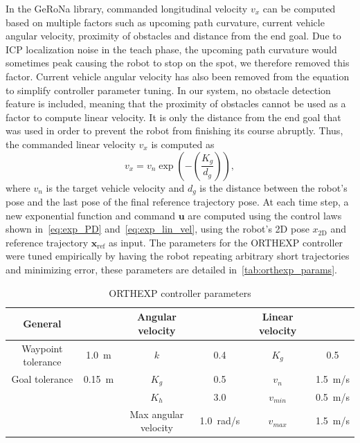 In the \ac{GeRoNa} library, commanded longitudinal velocity $v_x$ can be computed based on multiple factors such as upcoming path curvature, current vehicle angular velocity, proximity of obstacles and distance from the end goal.
Due to \ac{ICP} localization noise in the teach phase, the upcoming path curvature would sometimes peak causing the robot to stop on the spot, we therefore removed this factor.
Current vehicle angular velocity has also been removed from the equation to simplify controller parameter tuning.
In our system, no obstacle detection feature is included, meaning that the proximity of obstacles cannot be used as a factor to compute linear velocity.
It is only the distance from the end goal that was used in order to prevent the robot from finishing its course abruptly.
Thus, the commanded linear velocity $v_x$ is computed as
\begin{equation}
\label{eq:exp_lin_vel}
v_x = v_n \exp\left(-\left(\frac{K_g}{d_g}\right)\right),
\end{equation}
where $v_n$ is the target vehicle velocity and $d_g$ is the distance between the robot's pose and the last pose of the final reference trajectory pose. 
At each time step, a new exponential function and command $\bm u$ are computed using the control laws shown in~\autoref{eq:exp_PD} and~\autoref{eq:exp_lin_vel}, using the robot's 2D pose $x_{\text{2D}}$ and reference trajectory $\bm x_{\text{ref}}$ as input.
The parameters for the \ac{ORTHEXP} controller were tuned empirically by having the robot repeating arbitrary short trajectories and minimizing error, these parameters are detailed in~\autoref{tab:orthexp_params}.


\begin{table}[htpb]
	\caption{\ac{ORTHEXP} controller parameters} \label{tab:orthexp_params}
	\begin{center}
		\begin{tabular}{c c | c c | c c}
			General & & Angular velocity & & Linear velocity \\
			\hline
			Waypoint tolerance & \SI{1.0}{m} & $k$ & 0.4 & $K_g$ & 0.5 \\
			Goal tolerance & \SI{0.15}{m} & $K_g$ & 0.5 & $v_n$ & \SI{1.5}{m/s} \\
			 & & $K_h$ & 3.0 & $v_{min}$ & \SI{0.5}{m/s} \\
			 & & Max angular velocity & \SI{1.0}{rad/s} & $v_{max}$ & \SI{1.5}{m/s} \\
			\hline
		\end{tabular}
	\end{center}
\end{table}

